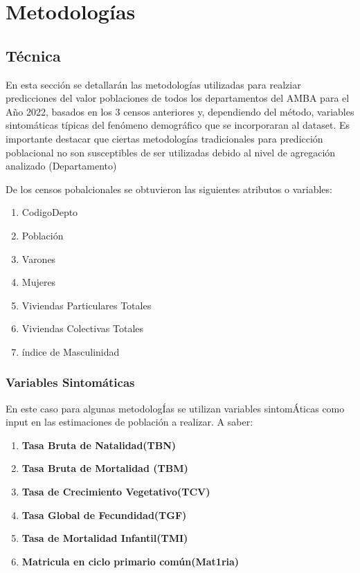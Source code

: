 \documentclass{article}
\theoremstyle{mytheoremstyle}
\theoremstyle{mytheoremstyle}
\theoremstyle{myproblemstyle}
\begin{document}
\section{Metodologías}
\subsection{Técnica }
En esta sección se detallarán las metodologías utilizadas para realziar predicciones del valor poblaciones de todos los 
departamentos del AMBA para el Año 2022, basados en los 3 censos anteriores y, dependiendo del método, variables sintomáticas 
 típicas del fenómeno demográfico que se incorporaran al dataset. Es importante destacar que ciertas metodologías tradicionales
 para predicción poblacional no son susceptibles de ser utilizadas debido al nivel de agregación analizado (Departamento)\newline
  
 De los censos pobalcionales se obtuvieron las siguientes atributos o variables: 
 \begin{enumerate}
  \item CodigoDepto 
  \item	Población
  \item Varones
  \item Mujeres
  \item Viviendas Particulares Totales
  \item Viviendas Colectivas Totales
  \item índice de Masculinidad
 \end{enumerate} 

\subsubsection{Variables Sintomáticas}
En este caso para algunas metodologÍas se utilizan variables sintomÁticas como input en las
 estimaciones de población a realizar. A saber:
 \begin{enumerate}
    \item \textbf{Tasa Bruta de Natalidad(TBN)}
    \item	\textbf{Tasa Bruta de Mortalidad (TBM)}
    \item \textbf{Tasa de Crecimiento Vegetativo(TCV)}
    \item \textbf{Tasa Global de Fecundidad(TGF)}
    \item \textbf{Tasa de Mortalidad Infantil(TMI)} 
    \item \textbf{Matricula en ciclo primario común(Mat1ria)} 
  \end{enumerate}
 
\end{document}
